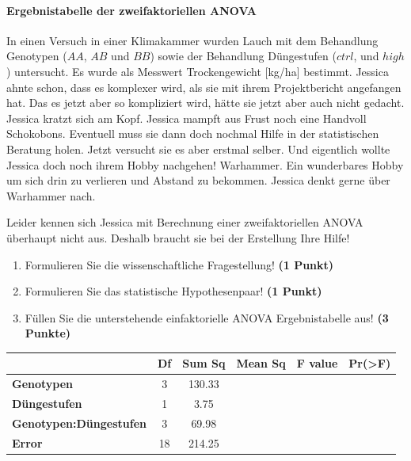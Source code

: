 \documentclass[a4paper, 9pt]{scrartcl}\usepackage[]{graphicx}\usepackage[]{xcolor}
\begin{document}
\paragraph{Ergebnistabelle der zweifaktoriellen ANOVA}

In einen Versuch in einer Klimakammer wurden Lauch mit dem Behandlung Genotypen ($AA$, $AB$ und $BB$) sowie der Behandlung Düngestufen ($ctrl$, und $high$) untersucht. Es wurde als Messwert Trockengewicht [kg/ha] bestimmt. Jessica ahnte schon, dass es komplexer wird, als sie mit ihrem Projektbericht angefangen hat. Das es jetzt aber so kompliziert wird, hätte sie jetzt aber auch nicht gedacht. Jessica kratzt sich am Kopf. Jessica mampft aus Frust noch eine Handvoll Schokobons. Eventuell muss sie dann doch nochmal Hilfe in der statistischen Beratung holen. Jetzt versucht sie es aber erstmal selber. Und eigentlich wollte Jessica doch noch ihrem Hobby nachgehen! Warhammer. Ein wunderbares Hobby um sich drin zu verlieren und Abstand zu bekommen. Jessica denkt gerne über Warhammer nach.



\vspace{1ex}

Leider kennen sich Jessica mit Berechnung einer zweifaktoriellen ANOVA überhaupt nicht aus. Deshalb braucht sie bei der Erstellung Ihre Hilfe! 

\begin{enumerate}
  \item Formulieren Sie die wissenschaftliche Fragestellung! \textbf{(1 Punkt)}
  \item Formulieren Sie das statistische Hypothesenpaar! \textbf{(1 Punkt)}
\item Füllen Sie die unterstehende einfaktorielle ANOVA Ergebnistabelle aus! \textbf{(3 Punkte)}
\end{enumerate}

\vspace{1Ex}

\begin{center}
  \Large
  \begin{tabular}{lccccc}
  \toprule
     & \textbf{Df} & \textbf{Sum Sq} & \textbf{Mean Sq} & \textbf{F value} & \textbf{Pr(>F)} \strut\\
    \midrule
   \textbf{Genotypen}  & 3 & 130.33 &  &  &  \strut\\
    \textbf{Düngestufen}  & 1 & 3.75 &  &  &  \strut\\
    \textbf{Genotypen:Düngestufen}  & 3 & 69.98 &  &  &  \strut\\
   \textbf{Error}  & 18 & 214.25 &  &  &  \strut\\
\bottomrule
  \end{tabular}
\end{center}
\end{document}

